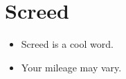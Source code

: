 \documentclass{article}
\begin{document}
\sloppy
\section{Screed}
\begin{itemize}
    \item Screed is a cool word.
    \item Your mileage may vary.
\end{itemize}
\end{document}
